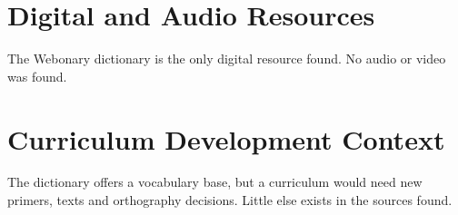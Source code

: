 \documentclass[12pt]{article}
\begin{document}
\section{Digital and Audio Resources}
The Webonary dictionary is the only digital resource found. No audio or video was found.

\section{Curriculum Development Context}
The dictionary offers a vocabulary base, but a curriculum would need new primers, texts and orthography decisions. Little else exists in the sources found.
\end{document}
